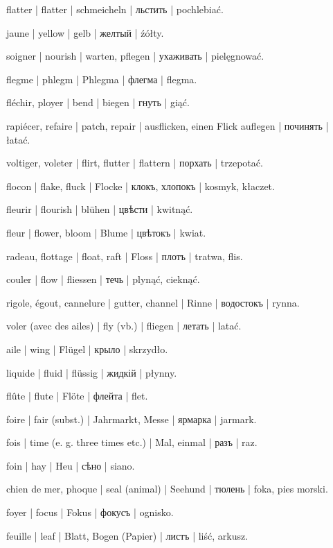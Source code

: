 \begin{outdent}{1em}
flatter | flatter | schmeicheln | льстить | pochlebiać.

jaune | yellow | gelb | желтый | źółty.

soigner | nourish | warten, pflegen | ухаживать | pielęgnować.

flegme | phlegm | Phlegma | флегма | flegma.

fléchir, ployer | bend | biegen | гнуть | giąć.

rapiécer, refaire | patch, repair | ausflicken, einen Flick auflegen | починять | łatać.

voltiger, voleter | flirt, flutter | flattern | порхать | trzepotać.

flocon | flake, fluck | Flocke | клокъ, хлопокъ | kosmyk,
kłaczet.

fleurir | flourish | blühen | цвѣсти | kwitnąć.

\uvsubentry{}
fleur | flower, bloom | Blume | цвѣтокъ | kwiat.

radeau, flottage | float, raft | Floss | плотъ | tratwa, flis.

couler | flow | fliessen | течь | plynąć, cieknąć.

\uvsubentry{}
rigole, égout, cannelure | gutter, channel | Rinne | водостокъ | rynna.

voler (avec des ailes) | fly (vb.) | fliegen | летать | latać.

\uvsubentry{}
aile | wing | Flügel | крыло | skrzydło.

liquide | fluid | flüssig | жидкій | płynny.

flûte | flute | Flöte | флейта | flet.

foire | fair (subst.) | Jahrmarkt, Messe | ярмарка | jarmark.

fois | time (e. g. three times etc.) | Mal, einmal | разъ | raz.

foin | hay | Heu | сѣно | siano.

chien de mer, phoque | seal (animal) | Seehund | тюлень | foka,
pies morski.

foyer | focus | Fokus | фокусъ | ognisko.

feuille | leaf | Blatt, Bogen (Papier) | листъ | liść,
arkusz.


\end{outdent}
